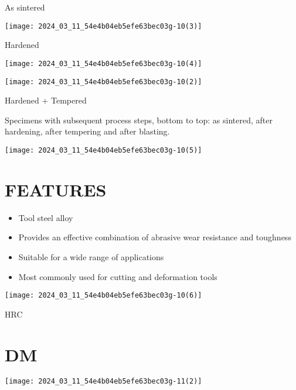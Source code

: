 \documentclass[10pt]{article}
\begin{document}
As sintered

\begin{center}
\texttt{[image: 2024\_03\_11\_54e4b04eb5efe63bec03g-10(3)]}
\end{center}

Hardened

\begin{center}
\texttt{[image: 2024\_03\_11\_54e4b04eb5efe63bec03g-10(4)]}
\end{center}

\begin{center}
\texttt{[image: 2024\_03\_11\_54e4b04eb5efe63bec03g-10(2)]}
\end{center}

Hardened + Tempered

Specimens with subsequent process steps, bottom to top: as sintered, after hardening, after tempering and after blasting.

\begin{center}
\texttt{[image: 2024\_03\_11\_54e4b04eb5efe63bec03g-10(5)]}
\end{center}

\section*{FEATURES}
\begin{itemize}
  \item Tool steel alloy
  \item Provides an effective combination of abrasive wear resistance and toughness
  \item Suitable for a wide range of applications
  \item Most commonly used for cutting and deformation tools
\end{itemize}

\begin{center}
\texttt{[image: 2024\_03\_11\_54e4b04eb5efe63bec03g-10(6)]}
\end{center}

HRC

\section*{DM}
\begin{center}
\texttt{[image: 2024\_03\_11\_54e4b04eb5efe63bec03g-11(2)]}
\end{center}
\end{document}
